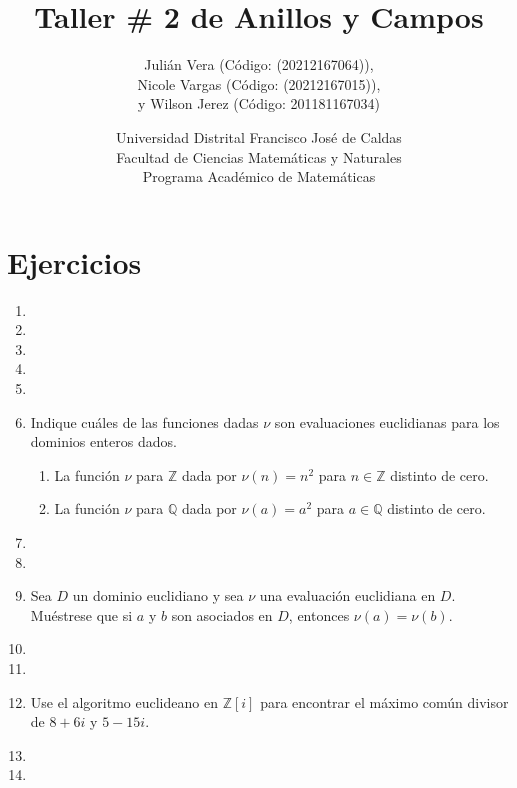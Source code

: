 \documentclass[12pt]{article}
\title{Taller \# 2 de Anillos y Campos}
\author{
    Julián Vera (Código: (20212167064)), \\
    Nicole Vargas (Código: (20212167015)), \\
    y Wilson Jerez (Código: 201181167034)
}
\date{
    Universidad Distrital Francisco José de Caldas \\
    Facultad de Ciencias Matemáticas y Naturales \\
    Programa Académico de Matemáticas
}
\theoremstyle{definition}
\theoremstyle{remark}
\begin{document}
\maketitle

\section*{Ejercicios}

\begin{enumerate}
    \item 
    
    \item 
    
    \item 
    
    \item 
    
    \item 
    
    \item Indique cuáles de las funciones dadas $\nu$ son evaluaciones euclidianas para los dominios enteros dados.
    \begin{enumerate}
        \item La función $\nu$ para $\mathbb{Z}$ dada por $\nu(n) = n^2$ para $n \in \mathbb{Z}$ distinto de cero.
        \item La función $\nu$ para $\mathbb{Q}$ dada por $\nu(a) = a^2$ para $a \in \mathbb{Q}$ distinto de cero.
    \end{enumerate}
    
    \item 
    
    \item 
    
    \item Sea $D$ un dominio euclidiano y sea $\nu$ una evaluación euclidiana en $D$. Muéstrese que si $a$ y $b$ son asociados en $D$, entonces $\nu(a) = \nu(b)$.
    
    \item 
    
    \item  
    
    \item Use el algoritmo euclideano en $\mathbb{Z}[i]$ para encontrar el máximo común divisor de $8 + 6i$ y $5 - 15i$.

    \item 
    \item 
\end{enumerate}
\end{document}
